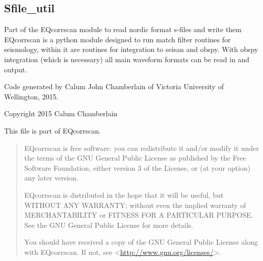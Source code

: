 \documentclass[a4paper,10pt,english]{sphinxmanual}
\begin{document}
\subsection{Sfile\_util}
\label{submodules/utils.Sfile_util:module-Sfile_util}\label{submodules/utils.Sfile_util:sfile-util}\label{submodules/utils.Sfile_util::doc}
Part of the EQcorrscan module to read nordic format s-files and write them
EQcorrscan is a python module designed to run match filter routines for
seismology, within it are routines for integration to seisan and obspy.
With obspy integration (which is necessary) all main waveform formats can be
read in and output.

Code generated by Calum John Chamberlain of Victoria University of Wellington,
2015.

Copyright 2015 Calum Chamberlain

This file is part of EQcorrscan.
\begin{quote}

EQcorrscan is free software: you can redistribute it and/or modify
it under the terms of the GNU General Public License as published by
the Free Software Foundation, either version 3 of the License, or
(at your option) any later version.

EQcorrscan is distributed in the hope that it will be useful,
but WITHOUT ANY WARRANTY; without even the implied warranty of
MERCHANTABILITY or FITNESS FOR A PARTICULAR PURPOSE.  See the
GNU General Public License for more details.

You should have received a copy of the GNU General Public License
along with EQcorrscan.  If not, see \textless{}\href{http://www.gnu.org/licenses/}{http://www.gnu.org/licenses/}\textgreater{}.
\end{quote}
\end{document}
